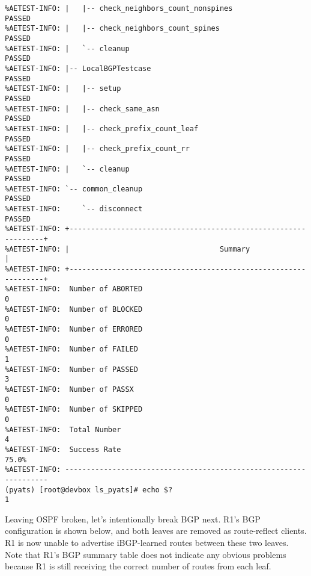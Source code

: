 \begin{verbatim}
%AETEST-INFO: |   |-- check_neighbors_count_nonspines                     PASSED
%AETEST-INFO: |   |-- check_neighbors_count_spines                        PASSED
%AETEST-INFO: |   `-- cleanup                                             PASSED
%AETEST-INFO: |-- LocalBGPTestcase                                        PASSED
%AETEST-INFO: |   |-- setup                                               PASSED
%AETEST-INFO: |   |-- check_same_asn                                      PASSED
%AETEST-INFO: |   |-- check_prefix_count_leaf                             PASSED
%AETEST-INFO: |   |-- check_prefix_count_rr                               PASSED
%AETEST-INFO: |   `-- cleanup                                             PASSED
%AETEST-INFO: `-- common_cleanup                                          PASSED
%AETEST-INFO:     `-- disconnect                                          PASSED
%AETEST-INFO: +----------------------------------------------------------------+
%AETEST-INFO: |                                   Summary                      |
%AETEST-INFO: +----------------------------------------------------------------+
%AETEST-INFO:  Number of ABORTED                                              0
%AETEST-INFO:  Number of BLOCKED                                              0
%AETEST-INFO:  Number of ERRORED                                              0
%AETEST-INFO:  Number of FAILED                                               1
%AETEST-INFO:  Number of PASSED                                               3
%AETEST-INFO:  Number of PASSX                                                0
%AETEST-INFO:  Number of SKIPPED                                              0
%AETEST-INFO:  Total Number                                                   4
%AETEST-INFO:  Success Rate                                               75.0%
%AETEST-INFO: ------------------------------------------------------------------
(pyats) [root@devbox ls_pyats]# echo $?
1
\end{verbatim}

Leaving OSPF broken, let's intentionally break BGP next. R1's BGP configuration
is shown below, and both leaves are removed as route-reflect clients. R1 is now
unable to advertise iBGP-learned routes between these two leaves. Note that
R1's BGP summary table does not indicate any obvious problems because R1 is
still receiving the correct number of routes from each leaf.

